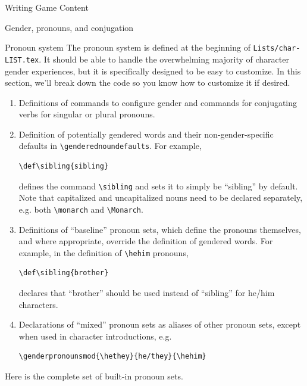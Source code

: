 \documentclass[sheet]{GameTexBase}
\begin{document}
\begin{section}{Writing Game Content}
\begin{subsection}{Gender, pronouns, and conjugation}
\begin{subsubsection}{Pronoun system}
The pronoun system is defined at the beginning of \lstinline|Lists/char-LIST.tex|.  It should be able to handle the overwhelming majority of character gender experiences, but it is specifically designed to be easy to customize.
In this section, we'll break down the code so you know how to customize it if desired.

\begin{enumerate}
\item Definitions of commands to configure gender and commands for conjugating verbs for singular or plural pronouns.
\item Definition of potentially gendered words and their non-gender-specific defaults in \lstinline|\genderednoundefaults|.  For example,
\begin{verbatim}
\def\sibling{sibling}
\end{verbatim}
defines the command \lstinline|\sibling| and sets it to simply be ``sibling'' by default.  Note that capitalized and uncapitalized nouns need to be declared separately, e.g. both \lstinline|\monarch| and \lstinline|\Monarch|.
\item Definitions of ``baseline'' pronoun sets, which define the pronouns themselves, and where appropriate, override the definition of gendered words.  For example, in the definition of \lstinline|\hehim| pronouns,
\begin{verbatim}
\def\sibling{brother}
\end{verbatim}
declares that ``brother'' should be used instead of ``sibling'' for he/him characters.
\item Declarations of ``mixed'' pronoun sets as aliases of other pronoun sets, except when used in character introductions, e.g.
\begin{verbatim}
\genderpronounsmod{\hethey}{he/they}{\hehim}
\end{verbatim}
\end{enumerate}

Here is the complete set of built-in pronoun sets.


\end{subsubsection}
\end{subsection}
\end{section}
\end{document}
